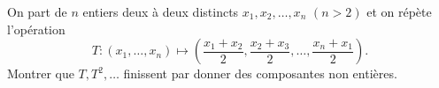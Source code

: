 On part de $n$ entiers deux à deux distincts $x_1, x_2, \ldots, x_n$ $(n > 2)$ et on répète l'opération
\[ T : (x_1, \ldots, x_n) \mapsto \left(\frac{x_1 + x_2}{2}, \frac{x_2 + x_3}{2}, \ldots, \frac{x_n + x_1}{2}\right). \]
Montrer que $T, T^2, \ldots$ finissent par donner des composantes non entières.
